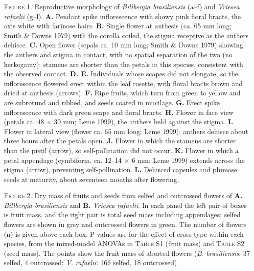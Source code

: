 \documentclass[
]{article}
\begin{document}
\textsc{Figure 1.} Reproductive morphology of \emph{Billbergia
brasiliensis} (a--f) and \emph{Vriesea rafaelii} (g--l). \textbf{A.}
Pendant spike inflorescence with showy pink floral bracts, the axis
white with farinose hairs. \textbf{B.} Single flower at anthesis (ca. 65
mm long; Smith \& Downs 1979) with the corolla coiled, the stigma
receptive as the anthers dehisce. \textbf{C.} Open flower (sepals ca. 10
mm long; Smith \& Downs 1979) showing the anthers and stigma in contact,
with no spatial separation of the two (no herkogamy); stamens are
shorter than the petals in this species, consistent with the observed
contact. \textbf{D. E.} Individuals whose scapes did not elongate, so
the inflorescence flowered erect within the leaf rosette, with floral
bracts brown and dried at anthesis (arrows). \textbf{F.} Ripe fruits,
which turn from green to yellow and are subrotund and ribbed, and seeds
coated in mucilage. \textbf{G.} Erect spike inflorescence with dark
green scape and floral bracts. \textbf{H.} Flower in face view (petals
ca. 48 × 30 mm; Leme 1999), the anthers held against the stigma.
\textbf{I.} Flower in lateral view (flower ca. 65 mm long; Leme 1999);
anthers dehisce about three hours after the petals open. \textbf{J.}
Flower in which the stamens are shorter than the pistil (arrow), so
self-pollination did not occur. \textbf{K.} Flower in which a petal
appendage (cymbiform, ca. 12--14 × 6 mm; Leme 1999) extends across the
stigma (arrow), preventing self-pollination. \textbf{L.} Dehisced
capsules and plumose seeds at maturity, about seventeen months after
flowering.

\textsc{Figure 2.} Dry mass of fruits and seeds from selfed and
outcrossed flowers of \textbf{A.} \emph{Billbergia brasiliensis} and
\textbf{B.} \emph{Vriesea rafaelii}. In each panel the left pair of
boxes is fruit mass, and the right pair is total seed mass including
appendages; selfed flowers are shown in grey and outcrossed flowers in
green. The number of flowers (n) is given above each box. P values are
for the effect of cross type within each species, from the mixed-model
ANOVAs in \textsc{Table S1} (fruit mass) and \textsc{Table S2} (seed
mass). The points show the fruit mass of aborted flowers (\emph{B.
brasiliensis}: 37 selfed, 4 outcrossed; \emph{V. rafaelii}: 166 selfed,
18 outcrossed).
\end{document}
